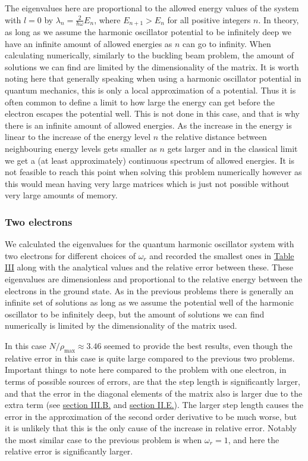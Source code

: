 \documentclass[reprint,english,notitlepage]{revtex4-1}  %
\begin{document}
The eigenvalues here are proportional to the allowed energy values of the system with $l=0$ by $\lambda_n = \frac{2}{\hbar \omega} E_n$, where $E_{n+1} > E_n$ for all positive integers $n$. In theory, as long as we assume the harmonic oscillator potential to be infinitely deep we have an infinite amount of allowed energies as $n$ can go to infinity. When calculating numerically, similarly to the buckling beam problem, the amount of solutions we can find are limited by the dimensionality of the matrix. It is worth noting here that generally speaking when using a harmonic oscillator potential in quantum mechanics, this is only a local approximation of a potential. Thus it is often common to define a limit to how large the energy can get before the electron escapes the potential well. This is not done in this case, and that is why there is an infinite amount of allowed energies. As the increase in the energy is linear to the increase of the energy level $n$ the relative distance between neighbouring energy levels gets smaller as $n$ gets larger and in the classical limit we get a (at least approximately) continuous spectrum of allowed energies. It is not feasible to reach this point when solving this problem numerically however as this would mean having very large matrices which is just not possible without very large amounts of memory.


\subsubsection{Two electrons} \label{sec:V:b:ii}

We calculated the eigenvalues for the quantum harmonic oscillator system with two electrons for different choices of $\omega_r$ and recorded the smallest ones in \hyperref[table:IV:c:1]{Table III} along with the analytical values and the relative error between these. These eigenvalues are dimensionless and proportional to the relative energy between the electrons in the ground state. As in the previous problems there is generally an infinite set of solutions as long as we assume the potential well of the harmonic oscillator to be infinitely deep, but the amount of solutions we can find numerically is limited by the dimensionality of the matrix used. 

In this case $N/\rho_\text{max} \approx 3.46$ seemed to provide the best results, even though the relative error in this case is quite large compared to the previous two problems. Important things to note here compared to the problem with one electron, in terms of possible sources of errors, are that the step length is significantly larger, and that the error in the diagonal elements of the matrix also is larger due to the extra term (see \hyperref[sec:III:b]{section III.B.} and \hyperref[sec:II:e]{section II.E.}). The larger step length causes the error in the approximation of the second order derivative to be much worse, but it is unlikely that this is the only cause of the increase in relative error. Notably the most similar case to the previous problem is when $\omega_r = 1$, and here the relative error is significantly larger. 
\end{document}
